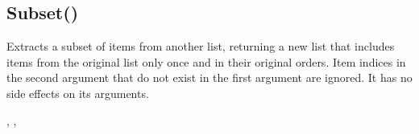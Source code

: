\documentclass[letterpaper,10pt,english]{sphinxmanual}
\begin{document}
\ignorespaces 

\subsection{Subset()}
\label{\detokenize{reference/design:subset}}\label{\detokenize{reference/design:index-20}}
\sphinxAtStartPar
{}

\sphinxAtStartPar
{}

\sphinxAtStartPar
Extracts a subset of items from another list,   returning a new list that includes items from the original list only   once and in their original orders.  Item indices in the second   argument that do not exist in the first argument are ignored.  It   has no side effects on its arguments.

\sphinxAtStartPar
{}

\begin{sphinxVerbatim}[commandchars=\\\{\}]
\end{sphinxVerbatim}

\sphinxAtStartPar
{}

\begin{sphinxVerbatim}[commandchars=\\\{\}]
\PYG{p}{[}\PYG{p}{]}\PYG{p}{[}\PYG{p}{]}
\PYG{p}{[}\PYG{p}{]}\PYG{p}{[}\PYG{p}{]}
\end{sphinxVerbatim}

\sphinxAtStartPar
{}

\sphinxAtStartPar
{}, , 
\end{document}
